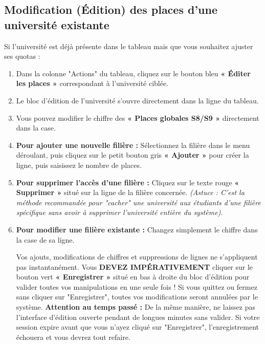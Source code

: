 \documentclass[12pt,a4paper]{article}
\begin{document}
\subsection{Modification (Édition) des places d'une université existante}
Si l'université est déjà présente dans le tableau mais que vous souhaitez ajuster ses quotas :
\begin{enumerate}
    \item Dans la colonne "Actions" du tableau, cliquez sur le bouton bleu \textbf{« Éditer les places »} correspondant à l'université ciblée.
    \item Le bloc d'édition de l'université s'ouvre directement dans la ligne du tableau.
    \item Vous pouvez modifier le chiffre des \textbf{« Places globales S8/S9 »} directement dans la case.
    \item \textbf{Pour ajouter une nouvelle filière :} Sélectionnez la filière dans le menu déroulant, puis cliquez sur le petit bouton gris \textbf{« Ajouter »} pour créer la ligne, puis saisissez le nombre de places.
    \item \textbf{Pour supprimer l'accès d'une filière :} Cliquez sur le texte rouge \textbf{« Supprimer »} situé sur la ligne de la filière concernée. 
    \newline \textit{(Astuce : C'est la méthode recommandée pour "cacher" une université aux étudiants d'une filière spécifique sans avoir à supprimer l'université entière du système).}
    \item \textbf{Pour modifier une filière existante :} Changez simplement le chiffre dans la case de sa ligne.
    \begin{tcolorbox}[colback=red!5!white,colframe=red!75!black,title=⚠️ ENREGISTREMENT FINAL OBLIGATOIRE ET RISQUE D'EXPIRATION]
    Vos ajouts, modifications de chiffres et suppressions de lignes ne s'appliquent pas instantanément. Vous \textbf{DEVEZ IMPÉRATIVEMENT} cliquer sur le bouton vert \textbf{« Enregistrer »} situé en bas à droite du bloc d'édition pour valider toutes vos manipulations en une seule fois ! Si vous quittez ou fermez sans cliquer sur "Enregistrer", toutes vos modifications seront annulées par le système.
    \newline \textbf{Attention au temps passé :} De la même manière, ne laissez pas l'interface d'édition ouverte pendant de longues minutes sans valider. Si votre session expire avant que vous n'ayez cliqué sur "Enregistrer", l'enregistrement échouera et vous devrez tout refaire.
    \end{tcolorbox}
\end{enumerate}
\end{document}
